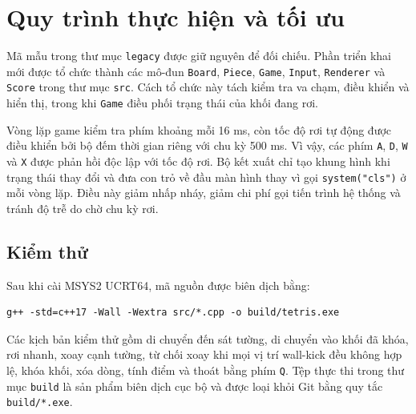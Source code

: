 \section{Quy trình thực hiện và tối ưu}

Mã mẫu trong thư mục \texttt{legacy} được giữ nguyên để đối chiếu. Phần
triển khai mới được tổ chức thành các mô-đun \texttt{Board}, \texttt{Piece},
\texttt{Game}, \texttt{Input}, \texttt{Renderer} và \texttt{Score} trong
thư mục \texttt{src}. Cách tổ chức này tách kiểm tra va chạm, điều khiển và
hiển thị, trong khi \texttt{Game} điều phối trạng thái của khối đang rơi.

Vòng lặp game kiểm tra phím khoảng mỗi 16 ms, còn tốc độ rơi tự động được
điều khiển bởi bộ đếm thời gian riêng với chu kỳ 500 ms. Vì vậy, các phím
\texttt{A}, \texttt{D}, \texttt{W} và \texttt{X} được phản hồi độc lập với
tốc độ rơi. Bộ kết xuất chỉ tạo khung hình khi trạng thái thay đổi và đưa
con trỏ về đầu màn hình thay vì gọi \texttt{system("cls")} ở mỗi vòng lặp.
Điều này giảm nhấp nháy, giảm chi phí gọi tiến trình hệ thống và tránh độ
trễ do chờ chu kỳ rơi.

\subsection{Kiểm thử}

Sau khi cài MSYS2 UCRT64, mã nguồn được biên dịch bằng:

\begin{verbatim}
g++ -std=c++17 -Wall -Wextra src/*.cpp -o build/tetris.exe
\end{verbatim}

Các kịch bản kiểm thử gồm di chuyển đến sát tường, di chuyển vào khối đã
khóa, rơi nhanh, xoay cạnh tường, từ chối xoay khi mọi vị trí wall-kick đều
không hợp lệ, khóa khối, xóa dòng, tính điểm và thoát bằng phím \texttt{Q}.
Tệp thực thi trong thư mục \texttt{build} là sản phẩm biên dịch cục bộ và
được loại khỏi Git bằng quy tắc \texttt{build/*.exe}.
